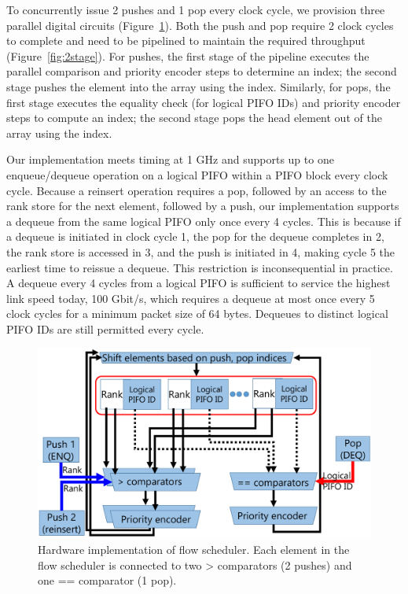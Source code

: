 To concurrently issue 2 pushes and 1 pop every clock cycle, we provision three
parallel digital circuits (Figure~\ref{fig:flow_scheduler}). Both the
push and pop require 2 clock cycles to complete and need to be pipelined
 to maintain the required throughput (Figure~\ref{fig:2stage}). For pushes, the first stage of the pipeline executes
the parallel comparison and priority encoder steps to determine an index; the
second stage pushes the element into the array using the index.  Similarly, for
pops, the first stage executes the equality check (for logical PIFO IDs) and
priority encoder steps to compute an index; the second stage pops the head
element out of the array using the index.

Our implementation meets timing at 1 GHz and supports up to one enqueue/dequeue
operation on a logical PIFO within a PIFO block every clock cycle. Because a
reinsert operation requires a pop, followed by an access to the rank store for
the next element, followed by a push, our implementation supports a dequeue
from the same logical PIFO only once every 4 cycles. This is because if a dequeue is initiated
in clock cycle 1, the pop for the dequeue completes in 2, the rank store is accessed in 3, and
the push is initiated in 4, making cycle 5 the earliest time to reissue a dequeue.
This restriction is inconsequential in practice.  A dequeue every 4 cycles from
a logical PIFO is sufficient to service the highest link speed today, 100
Gbit/s, which requires a dequeue at most once every 5 clock cycles for a
minimum packet size of 64 bytes. Dequeues to distinct logical PIFO IDs are
still permitted every cycle.

\begin{figure}[!t]
  \centering
  \includegraphics[width=0.6\columnwidth]{pifo_flow_scheduler_hardware.pdf}
  \caption{Hardware implementation of flow scheduler. Each element in the flow
  scheduler is connected to two > comparators (2 pushes) and one == comparator (1
  pop).}
  \label{fig:flow_scheduler}
\end{figure}

